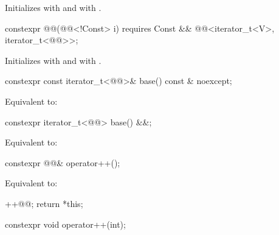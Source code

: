 \begin{itemdescr}
\pnum
\effects
Initializes  with  and
 with .
\end{itemdescr}

%
\begin{itemdecl}
constexpr @@(@@<!Const> i)
  requires Const && @@<iterator_t<V>, iterator_t<@@>>;
\end{itemdecl}

\begin{itemdescr}
\pnum
\effects
Initializes  with  and
 with .
\end{itemdescr}

%
\begin{itemdecl}
constexpr const iterator_t<@@>& base() const & noexcept;
\end{itemdecl}

\begin{itemdescr}
\pnum
\effects
Equivalent to: 
\end{itemdescr}

%
\begin{itemdecl}
constexpr iterator_t<@@> base() &&;
\end{itemdecl}

\begin{itemdescr}
\pnum
\effects
Equivalent to: 
\end{itemdescr}

%
\begin{itemdecl}
constexpr @@& operator++();
\end{itemdecl}

\begin{itemdescr}
\pnum
\effects
Equivalent to:
\begin{codeblock}
++@@;
return *this;
\end{codeblock}
\end{itemdescr}

%
\begin{itemdecl}
constexpr void operator++(int);
\end{itemdecl}


